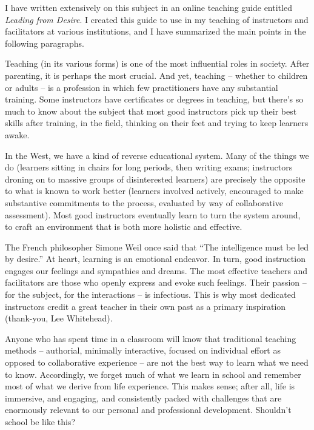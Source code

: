 \documentclass[10pt,DIV09,letterpaper,oneside,headsepline]{scrreprt}
\begin{document}
I have written extensively on this subject in an online teaching guide entitled \textit{Leading from Desire}. I created this guide to use in my teaching of instructors and facilitators at various institutions, and I have summarized the main points in the following paragraphs.

Teaching (in its various forms) is one of the most influential roles in society. After parenting, it is perhaps the most crucial. And yet, teaching -- whether to children or adults -- is a profession in which few practitioners have any substantial training. Some instructors have certificates or degrees in teaching, but there's so much to know about the subject that most good instructors pick up their best skills after training, in the field, thinking on their feet and trying to keep learners awake.

In the West, we have a kind of reverse educational system. Many of the things we do (learners sitting in chairs for long periods, then writing exams; instructors droning on to massive groups of disinterested learners) are precisely the opposite to what is known to work better (learners involved actively, encouraged to make substantive commitments to the process, evaluated by way of collaborative assessment). Most good instructors eventually learn to turn the system around, to craft an environment that is both more holistic and effective.

The French philosopher Simone Weil once said that ``The intelligence must be led by desire.'' At heart, learning is an emotional endeavor. In turn, good instruction engages our feelings and sympathies and dreams. The most effective teachers and facilitators are those who openly express and evoke such feelings. Their passion -- for the subject, for the interactions -- is infectious. This is why most dedicated instructors credit a great teacher in their own past as a primary inspiration (thank-you, Lee Whitehead).

Anyone who has spent time in a classroom will know that traditional teaching methods -- authorial, minimally interactive, focused on individual effort as opposed to collaborative experience -- are not the best way to learn what we need to know. Accordingly, we forget much of what we learn in school and remember most of what we derive from life experience. This makes sense; after all, life is immersive, and engaging, and consistently packed with challenges that are enormously relevant to our personal and professional development. Shouldn't school be like this?
\end{document}
